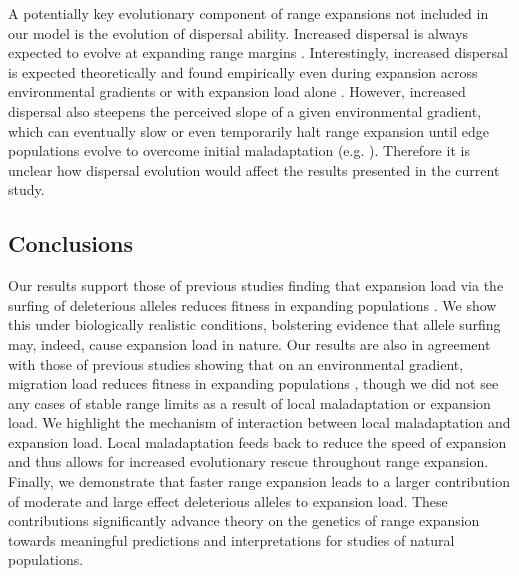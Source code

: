 A potentially key evolutionary component of range expansions not included in our model is the evolution of dispersal ability. Increased dispersal is always expected to evolve at expanding range margins \citep{Hargreaves:2014}. Interestingly, increased dispersal is expected theoretically and found empirically even during expansion across environmental gradients or with expansion load alone \citep{Henry:2015b}. However, increased dispersal also steepens the perceived slope of a given environmental gradient, which can eventually slow or even temporarily halt range expansion until edge populations evolve to overcome initial maladaptation (e.g. \citealt{Phillips:2012}). Therefore it is unclear how dispersal evolution would affect the results presented in the current study.


\subsection{Conclusions}

Our results support those of previous studies finding that expansion load via the surfing of deleterious alleles reduces fitness in expanding populations \citep{Peischl:2013, Peischl:2015, Peischl:2015b}. We show this under biologically realistic conditions, bolstering evidence that allele surfing may, indeed, cause expansion load in nature. Our results are also in agreement with those of previous studies showing that on an environmental gradient, migration load reduces fitness in expanding populations \citep{Kirkpatrick:1997, Bridle:2010, Polechova:2015}, though we did not see any cases of stable range limits as a result of local maladaptation or expansion load. We highlight the mechanism of interaction between local maladaptation and expansion load. Local maladaptation feeds back to reduce the speed of expansion and thus allows for increased evolutionary rescue throughout range expansion. Finally, we demonstrate that faster range expansion leads to a larger contribution of moderate and large effect deleterious alleles to expansion load. These contributions significantly advance theory on the genetics of range expansion towards meaningful predictions and interpretations for studies of natural populations.




